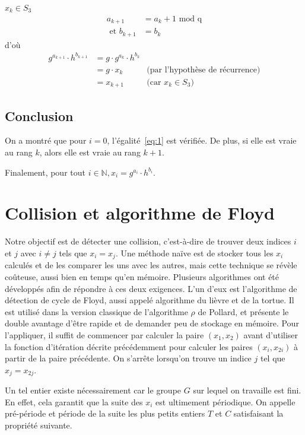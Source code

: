         \underline{$x_{k} \in S_3$}
        \begin{align*}
          a_{k+1} &= a_k + 1 \text{\ mod q} \\
          \text{\ et } b_{k+1} &= b_k
        \end{align*}
        d'où
        \begin{align*}
          g^{a_{k+1}} \cdot h^{b_{k+1}} &= g \cdot g^{a_k} \cdot h^{b_k} \\
                                        &= g \cdot x_k & \text{(par l'hypothèse de récurrence)} \\
                                        &= x_{k+1} & \text{(car $x_k \in S_3$)}
        \end{align*}


        \subsection*{Conclusion}
        On a montré que pour $i = 0$, l'égalité~\ref{eq:1} est vérifiée.
        De plus, si elle est vraie au rang $k$, alors elle est vraie au rang $k+1$.

        Finalement, pour tout $i \in \mathbb{N}, x_i = g^{a_i} \cdot h^{b_i}$.

        \section{Collision et algorithme de Floyd}
        \label{chapter1:Floyd}
        Notre objectif est de détecter une collision, c'est-à-dire de trouver deux indices $i$ et $j$ avec $i \ne j$ tels que $x_i = x_j$. Une méthode naïve est de stocker tous les $x_i$ calculés et de les comparer les uns avec les autres, mais cette technique se révèle coûteuse, aussi bien en temps qu'en mémoire. Plusieurs algorithmes ont été développés afin de répondre à ces deux exigences. L'un d'eux est l'algorithme de détection de cycle de Floyd, aussi appelé algorithme du lièvre et de la tortue. Il est utilisé dans la version classique de l'algorithme \texorpdfstring{$\rho$}{Rho} de Pollard, et présente le double avantage d'être rapide et de demander peu de stockage en mémoire. Pour l'appliquer, il suffit de commencer par calculer la paire $(x_1, x_2)$ avant d'utiliser la fonction d'itération décrite précédemment pour calculer les paires $(x_i, x_{2i})$ à partir de la paire précédente. On s'arrête lorsqu'on trouve un indice $j$ tel que $x_j = x_{2j}$.

        Un tel entier existe nécessairement car le groupe $G$ sur lequel on travaille est fini. En effet, cela garantit que la suite des $x_i$ est ultimement périodique. On appelle pré-période et période de la suite les plus petits entiers $T$ et $C$ satisfaisant la propriété suivante.

